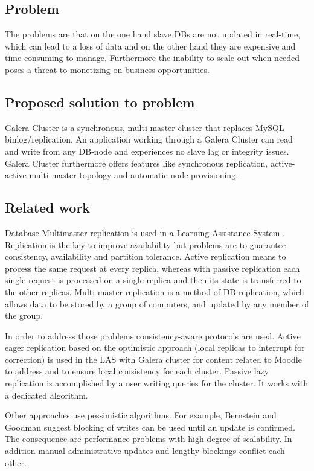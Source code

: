 \documentclass{sig-alternate}
\begin{document}
\subsection{Problem}
The problems are that on the one hand slave DBs are not updated in real-time, which can lead to a loss of data and on the other hand they are expensive and time-consuming to manage. Furthermore the inability to scale out when needed poses a threat to monetizing on business opportunities.

\subsection{Proposed solution to problem}
Galera Cluster is a synchronous, multi-master-cluster that replaces MySQL binlog/replication. An application working through a Galera Cluster can read and write from any DB-node and experiences no slave lag or integrity issues. Galera Cluster furthermore offers features like synchronous replication, active-active multi-master topology and automatic node provisioning.

\subsection{Related work}
Database Multimaster replication is used in a Learning Assistance System \cite{gautam2016multi}. Replication is the key to improve availability but problems are to guarantee consistency, availability and partition tolerance.
Active replication means to process the same request at every replica, whereas with passive replication each single request is processed on a single replica and then its state is transferred to the other replicas.
Multi master replication is a method of DB replication, which allows data to be stored by a group of computers, and updated by any member of the group.

In order to address those problems consistency-aware protocols are used. Active eager replication based on the optimistic approach (local replicas to interrupt for correction) is used in the LAS with Galera cluster for content related to Moodle to address and to ensure local consistency for each cluster. Passive lazy replication is accomplished by a user writing queries for the cluster. It works with a dedicated algorithm. 

Other approaches use pessimistic algorithms. For example, Bernstein and Goodman \cite{bernstein1985serializability} suggest blocking of writes can be used until an update is confirmed. The consequence are performance problems with high degree of scalability. In addition manual administrative updates and lengthy blockings conflict each other.
\end{document}
